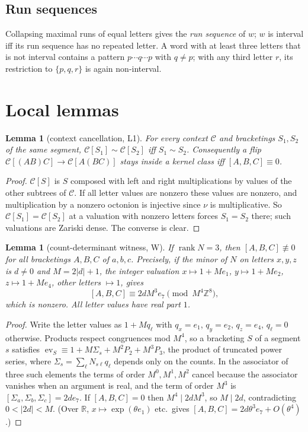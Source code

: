 \documentclass[11pt,a4paper]{article}
\newtheorem{lemma}[thm]{Lemma}
\theoremstyle{definition}
\theoremstyle{remark}
\newcommand{\ZZ}{\mathbb{Z}}
\newcommand{\RR}{\mathbb{R}}
\newcommand{\assoc}[3]{[#1,#2,#3]}
\newcommand{\ctx}{\mathcal{C}}
\DeclareMathOperator{\rank}{rank}
\DeclareMathOperator{\ev}{ev}
\begin{document}
\subsection{Run sequences}
Collapsing maximal runs of equal letters gives the \emph{run sequence} of $w$; $w$ is interval iff its
run sequence has no repeated letter. A word with at least three letters that is not interval contains a
pattern $p\cdots q\cdots p$ with $q\ne p$; with any third letter $r$, its restriction to $\{p,q,r\}$ is
again non-interval.

\section{Local lemmas}\label{sec:local}

\begin{lemma}[context cancellation, L1]\label{lem:L1}
For every context $\ctx$ and bracketings $S_1,S_2$ of the same segment, $\ctx[S_1]\sim\ctx[S_2]$ iff
$S_1\sim S_2$. Consequently a flip $\ctx[(AB)C]\to\ctx[A(BC)]$ stays inside a kernel class iff
$\assoc ABC\equiv0$.
\end{lemma}
\begin{proof}
$\ctx[S]$ is $S$ composed with left and right multiplications by values of the other subtrees of
$\ctx$. If all letter values are nonzero these values are nonzero, and multiplication by a nonzero
octonion is injective since $\nu$ is multiplicative. So $\ctx[S_1]=\ctx[S_2]$ at a valuation with
nonzero letters forces $S_1=S_2$ there; such valuations are Zariski dense. The converse is clear.
\end{proof}

\begin{lemma}[count-determinant witness, W]\label{lem:W}
If $\rank N=3$, then $\assoc ABC\not\equiv0$ for all bracketings $A,B,C$ of $a,b,c$. Precisely, if the
minor of $N$ on letters $x,y,z$ is $d\ne0$ and $M=2\lvert d\rvert+1$, the integer valuation
$x\mapsto1+Me_1$, $y\mapsto1+Me_2$, $z\mapsto1+Me_4$, other letters $\mapsto1$, gives
\[
  \assoc ABC\equiv 2dM^3e_7 \pmod{M^4\ZZ^8},
\]
which is nonzero. All letter values have real part $1$.
\end{lemma}
\begin{proof}
Write the letter values as $1+Mq_\ell$ with $q_x=e_1$, $q_y=e_2$, $q_z=e_4$, $q_\ell=0$ otherwise.
Products respect congruences mod $M^4$, so a bracketing $S$ of a segment $s$ satisfies
$\ev_S\equiv1+M\Sigma_s+M^2P_2+M^3P_3$, the product of truncated power series, where
$\Sigma_s=\sum_\ell N_{s\ell}q_\ell$ depends only on the counts. In the associator of three such
elements the terms of order $M^0,M^1,M^2$ cancel because the associator vanishes when an argument is
real, and the term of order $M^3$ is $\assoc{\Sigma_a}{\Sigma_b}{\Sigma_c}=2de_7$. If $\assoc ABC=0$
then $M^4\mid2dM^3$, so $M\mid2d$, contradicting $0<\lvert2d\rvert<M$. (Over $\RR$,
$x\mapsto\exp(\theta e_1)$ etc.\ gives $\assoc ABC=2d\theta^3e_7+O(\theta^4)$.)
\end{proof}
\end{document}
